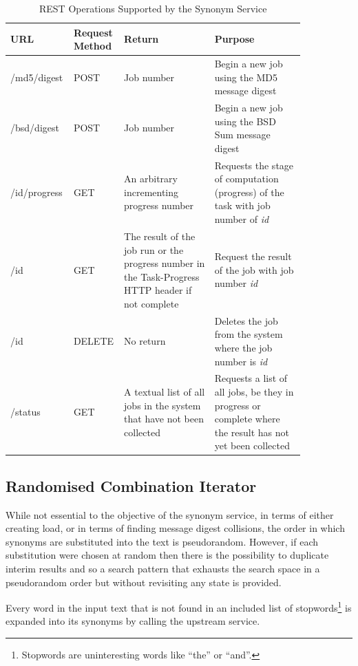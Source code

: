 \documentclass[]{final_report}
\begin{document}
\begin{table}[]
\begin{center}
\begin{tabular}{p{0.15\linewidth}p{0.1\linewidth}p{0.3\linewidth}p{0.3\linewidth}}
URL & Request Method & Return & Purpose \\ \hline
/md5/{digest} & POST & Job number & Begin a new job using the MD5 message digest \\ \hline 
/bsd/{digest} & POST & Job number &  Begin a new job using the BSD Sum message digest \\ \hline
/{id}/progress & GET & An arbitrary incrementing progress number & Requests the stage of computation (progress) of the task with job number of \textit{id} \\ \hline
/{id} & GET & The result of the job run or the progress number in the Task-Progress HTTP header if not complete & Request the result of the job with job number \textit{id} \\ \hline
/{id} & DELETE & No return & Deletes the job from the system where the job number is \textit{id} \\ \hline
/status & GET & A textual list of all jobs in the system that have not been collected & Requests a list of all jobs, be they in progress or complete where the result has not yet been collected \\ \hline
\end{tabular}
\caption{REST Operations Supported by the Synonym Service}
\end{center}
\label{table:rest_operations}
\end{table}

\subsection*{Randomised Combination Iterator}

While not essential to the objective of the synonym service, in terms of either creating load, or in terms of finding message digest collisions, the order in which synonyms are substituted into the text is pseudorandom. However, if each substitution were chosen at random then there is the possibility to duplicate interim results and so a search pattern that exhausts the search space in a pseudorandom order but without revisiting any state is provided.

Every word in the input text that is not found in an included list of stopwords\footnote{Stopwords are uninteresting words like ``the'' or ``and''.} is expanded into its synonyms by calling the upstream service.
\end{document}
